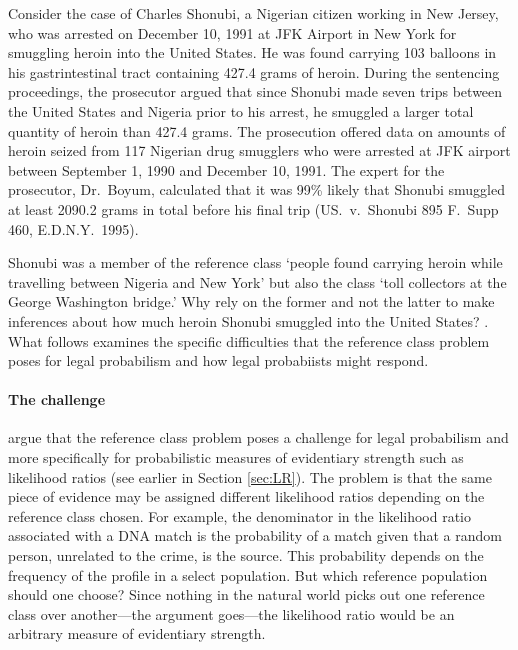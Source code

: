 \documentclass{article}
\begin{document}
Consider the case of Charles Shonubi, a Nigerian citizen working in New Jersey, who was arrested on December 10, 1991 at JFK Airport in New York for smuggling heroin into the United States. He was found carrying 103 balloons in his gastrintestinal tract containing 427.4 grams of heroin. 
 During the sentencing proceedings, the prosecutor argued that since Shonubi made seven trips between the United States and Nigeria prior to his arrest, he smuggled a larger total quantity of heroin than 427.4 grams. 
The prosecution offered data on amounts of heroin seized from 117 Nigerian drug smugglers %
who were arrested at JFK airport  between September 1, 1990 and December 10, 1991. 
The expert for the prosecutor, Dr.\ Boyum, calculated that it was 99\% likely that Shonubi smuggled at least 2090.2 grams in total before his final trip %
(US.\ v.\ Shonubi 895 F.\ Supp 460, E.D.N.Y.\ 1995).


Shonubi was a member of the reference class `people found carrying heroin while travelling between Nigeria and New York' but also the class `toll collectors at the George Washington bridge.' Why rely on the former and not the latter to make inferences about how much heroin Shonubi smuggled into the United States? 
\citep{colyvan2001crime}. 
What follows examines the specific difficulties that the reference class problem poses 
for legal probabilism and how legal probabiists might respond.

\paragraph{The challenge}
 
\citet{allen2007problematic} argue that the reference class problem poses a challenge for legal probabilism and more specifically for probabilistic measures of evidentiary strength such as likelihood ratios (see earlier in Section \ref{sec:LR}). The problem is that the same piece of evidence may be assigned different likelihood ratios depending on the reference class chosen. For example, the denominator in the likelihood ratio associated  with a DNA match  is the probability of a match given that a random person, unrelated to the crime, is the source. This probability depends on the frequency of the profile in a select population.  But which reference population should one choose?  Since nothing in the natural world picks out one reference class over another---the argument goes---the likelihood ratio would be an arbitrary measure of evidentiary strength. 
 
\end{document}
